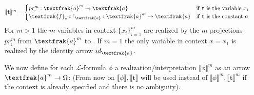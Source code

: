 \begin{definition}
	\begin{equation*}
		\llbracket \textbf{t} \rrbracket^m =
		\begin{cases}
			pr_i^m : \textfrak{a}^m \rightarrow \textfrak{a} & \text{if \textbf{t} is the variable $x_i$}\\
			\textfrak{f}_c \;\circ\; !_\textfrak{a} : \textfrak{a}^m \rightarrow \textfrak{a}  & \text{if \textbf{t} is the constant \textbf{c}}
		\end{cases}   
	\end{equation*}  
	For $m>1$ the $m$ variables in context $\{x_i\}_{i=1}^m$ are realized by the $m$ projections $pr_i^m$ from $\textfrak{a}^m$ to . \newline
	If $m=1$ the only variable in context $x = x_1$ is realized by the identity arrow $id_\textfrak{a}$.
\end{definition}


We now define for each $\mathcal{L}$-formula $\phi$ a realization/interpretation $\llbracket  \phi \rrbracket^m$ as an arrow $\textfrak{a}^m \rightarrow \Omega$:
\newline
(From now on $\llbracket  \phi \rrbracket, \llbracket  \textbf{t} \rrbracket $  will be used instead of $\llbracket  \phi \rrbracket^m, \llbracket  \textbf{t} \rrbracket^m$ if the context is already specified and there is no ambiguity).

